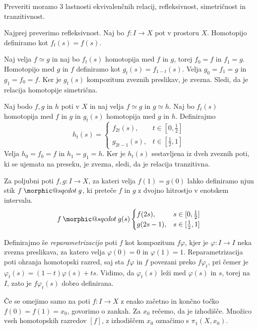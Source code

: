 \documentclass[mat1]{fmfdelo}
\makeatletter
\DeclareRobustCommand{\sqcdot}{\mathbin{\mathpalette\morphic@sqcdot\relax}}
\newcommand{\morphic@sqcdot}[2]{%
\sbox\z@{$\m@th#1\centerdot$}%
\ht\z@=.33333\ht\z@
\vcenter{\box\z@}%
}
\makeatother
\begin{document}
\begin{dokaz}
    Preveriti moramo 3 lastnosti ekvivalenčnih relacij, refleksivnost, simetričnost in tranzitivnost.

    Najprej preverimo refleksivnost. Naj bo $f : I \rightarrow X$ pot v prostoru $X$. Homotopijo definiramo kot $f_t(s)=f(s)$.
    
    Naj velja $f \simeq g$ in naj bo $f_t(s)$ homotopija med $f$ in $g$, 
    torej $f_0=f$ in $f_1=g$. Homotopijo med $g$ in $f$ definiramo kot 
    $g_t(s)=f_{1-t}(s)$. Velja $g_0=f_1=g$ in $g_1=f_0=f$. Ker je 
    $g_t(s)$ kompozitum zveznih preslikav, je zvezna. Sledi, da je 
    relacija homotopije simetrična.
    
    Naj bodo $f, g \text{ in } h$ poti v $X$ in naj velja $f \simeq g$ 
    in $g \simeq h$. Naj bo $f_t(s)$ homotopija med $f$ in $g$ in 
    $g_t(s)$ homotopija med $g$ in $h$. Definirajmo 
    $$h_t(s)=\begin{cases}
        f_{2t}(s), & t \in [0,\frac{1}{2}] \\
        g_{2t-1}(s), & t \in [\frac{1}{2},1]
    \end{cases}
    $$
    Velja $h_0=f_0=f$ in $h_1=g_1=h$. Ker je $h_t(s)$ sestavljena iz dveh zveznih poti, ki se ujemata na preseku, je zvezna, sledi, da je relacija tranzitivna.
\end{dokaz}

Za poljubni poti $f,g : I \rightarrow X$, za kateri velja $f(1) = g(0)$ 
lahko definiramo njun stik $f \sqcdot g$, ki preteče $f$ in $g$ z dvojno 
hitrostjo v enotskem intervalu.
$$ f \sqcdot g(s) \begin{cases}
    f(2s), &s \in [0,\frac{1}{2}] \\
    g(2s-1), & s \in [\frac{1}{2},1]
\end{cases}
$$

Definirajmo še \textit{reparametrizacijo} poti $f$ kot kompozitum $f 
    \varphi$, kjer je $\varphi: I \rightarrow I$ neka zvezna preslikava, za 
    katero velja $\varphi(0)= 0$ in $\varphi(1)=1$. Reparametrizacija poti 
    ohranja homotopski razred, saj sta $f\varphi$ in $f$ povezani preko 
    $f\varphi_t$, pri čemer je $\varphi_t(s)=(1-t)\varphi(s)+ts$. Vidimo, da 
    $\varphi_t(s)$ leži med $\varphi(s)$ in $s$, torej na $I$, zato je 
    $f\varphi_t(s)$ dobro definirana.



    Če se omejimo samo na poti $f:I \rightarrow X$ z enako začetno in končno točko $f(0) = f(1) = x_0$, govorimo o zankah. Za $x_0$ rečemo, da je izhodišče.
    Množico vseh homotopskih razredov $[f]$, z izhodiščem $x_0$ označimo s $\pi_1(X,x_0)$.
    
\end{document}
